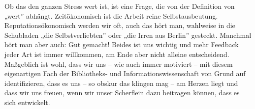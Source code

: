 \documentclass[output=paper]{langscibook}
\begin{document}
Ob das den ganzen Stress wert ist, ist eine Frage, die von der Definition von „wert” abhängt. Zeitökonomisch ist die Arbeit reine Selbstausbeutung. Reputationsökonomisch werden wir oft, auch das hört man, wahlweise in die Schubladen „die Selbstverliebten” oder „die Irren aus Berlin” gesteckt. Manchmal hört man aber auch: Gut gemacht! Beides ist uns wichtig und mehr Feedback jeder Art ist immer willkommen, am Ende aber nicht alleine entscheidend. Maßgeblich ist wohl, dass wir uns – wie auch immer motiviert – mit diesem eigenartigen Fach der Bibliotheks- und Informationswissenschaft von Grund auf identifizieren, dass es uns – so obskur das klingen mag – am Herzen liegt und dass wir uns freuen, wenn wir unser Scherflein dazu beitragen können, dass es sich entwickelt.
\end{document}
